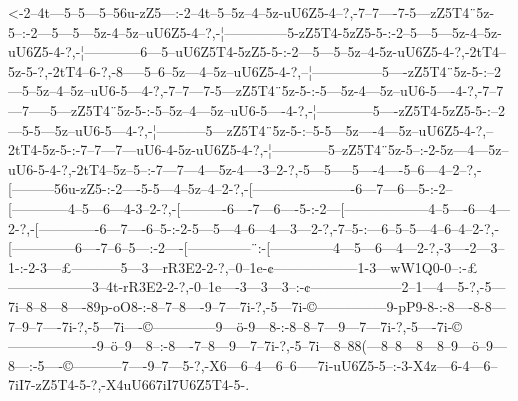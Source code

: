   {<-2--4t---5--5---5--56u-zZ5---:-2--4t--5--5z--4--5z-uU6Z5-4--?,-7--7----7-5---zZ5T4¨5z-5--:-2---5---5---5z-4--5z--uU6Z5-4--?,-¦--------------5-zZ5T4-5zZ5-5-:-2--5---5---5z-4--5z-uU6Z5-4-?,-¦------------6---5--uU6Z5T4-5zZ5-5-:-2---5---5--5z--4-5z-uU6Z5-4-?,-2tT4--5z-5-?,-2tT4--6-?,-8-----5--6--5z---4--5z--uU6Z5-4-?,--¦---------------5----zZ5T4¨5z-5-:--2---5--5z--4--5z--uU6-5---4-?,-7--7---7-5---zZ5T4¨5z-5-:-5---5z-4---5z--uU6-5----4-?,-7--7---7-----5---zZ5T4¨5z-5-:-5--5z--4---5z--uU6-5----4-?,-¦------------5----zZ5T4-5zZ5-5-:--2---5-5---5z--uU6-5---4-?,-¦-----------5---zZ5T4¨5z-5-:--5-5---5z----4---5z--uU6Z5-4-?,--2tT4-5z-5-:-7--7---7---uU6-4-5z-uU6Z5-4-?,-¦------------5--zZ5T4¨5z-5--:-2-5z---4---5z--uU6-5-4-?,-2tT4--5z--5--:-7---7---4---5z-4----3--2-?,-5---5-----5----4----5--6---4--2--?,-[---------56u-zZ5-:-2----5-5---4--5z--4--2-?,-[----------------------6---7---6---5-:-2--[------------4--5---6---4-3--2-?,-[----------6----7---6----5-:-2---[------------------4--5----6---4---2-?,-[-------------6---7----6--5-:-2-5---5---4--6---4---3---2-?,-7--5-:---6--5--5---4--6--4--2-?,-[--------------6----7--6--5---:-2----[--------------¨:-[--------------4---5---6---4---2-?,-3----2---3--1-:-2-3---£-----------5---3---rR3E2-2-?,--0--1e-¢------------------1-3---wW1Q0-0--:-£------------------3--4t-rR3E2-2-?,-0--1e----3---3---3--:-¢--------------------2--1---4---5-?,-5---7i--8--8---8----89p-oO8-:-8--7--8----9--7---7i-?,-5---7i-©---------------9-pP9-8-:-8----8-8---7--9--7----7i-?,-5---7i----©--------------9---ö-9---8-:-8--8--7---9---7---7i-?,-5----7i-©-------------------9--ö--9---8--:-8----7--8---9---7--7i-?,-5--7i---8--88(---8--8---8---8--9---ö--9---8---:-5----©-----------7----9--7---5-?,-X6---6--4---6--6-----7i-uU6Z5-5--:-3-X4z---6-4---6--7iI7-zZ5T4-5-?,-X4uU667iI7U6Z5T4-5-.}
